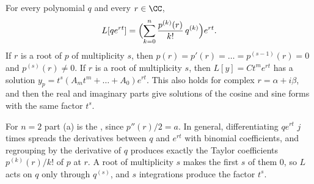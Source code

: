 \documentclass[10pt]{scrartcl}
\begin{document}
\begin{proposition*}
  \begin{enumerate}
    \ii[(a)] For every polynomial $q$ and every $r\in\CC$,
    \[
      L[qe^{rt}]=\Bigl(\sum_{k=0}^n\frac{p^{(k)}(r)}{k!}\,q^{(k)}\Bigr)e^{rt}.
    \]
    \ii[(b)] If $r$ is a root of $p$ of multiplicity $s$, then $p(r)=p'(r)=\dots=p^{(s-1)}(r)=0$ and $p^{(s)}(r)\neq 0$.
    \ii[(c)] If $r$ is a root of multiplicity $s$, then $L[y]=Ct^me^{rt}$ has a solution $y_p=t^s(A_mt^m+\dots+A_0)e^{rt}$. This also holds for complex $r=\alpha+i\beta$, and then the real and imaginary parts give solutions of the cosine and sine forms with the same factor $t^s$.
  \end{enumerate}
\end{proposition*}
\begin{ideabox}
  For $n=2$ part (a) is the , since $p''(r)/2=a$. In general, differentiating $qe^{rt}$ $j$ times spreads the derivatives between $q$ and $e^{rt}$ with binomial coefficients, and regrouping by the derivative of $q$ produces exactly the Taylor coefficients $p^{(k)}(r)/k!$ of $p$ at $r$. A root of multiplicity $s$ makes the first $s$ of them $0$, so $L$ acts on $q$ only through $q^{(s)}$, and $s$ integrations produce the factor $t^s$.
\end{ideabox}
\end{document}
